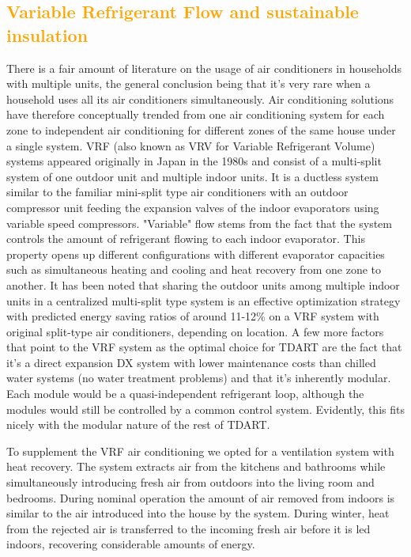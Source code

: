 \documentclass[justified]{tufte-book}
\begin{document}
	\textcolor{orange}{\chapter{Variable Refrigerant Flow and sustainable insulation}}
	There is a fair amount of literature\cite{jian2011study, ran2011wu, li2014testing}  on the usage of air conditioners in households  with multiple units, the general conclusion being that it's very rare when a household uses all its air conditioners simultaneously.
	Air conditioning solutions have therefore conceptually trended from one air conditioning system for each zone to independent air conditioning for different zones of the same house under a single system\cite{park2001performance}. VRF (also known as VRV for Variable Refrigerant Volume) systems appeared originally in Japan in the 1980s and consist of a multi-split system of one outdoor unit and multiple indoor units. It is a ductless system similar to the familiar mini-split type air conditioners with an outdoor compressor unit feeding the expansion valves of the indoor evaporators using variable speed compressors. "Variable" flow stems from the fact that the system controls the amount of refrigerant flowing to each indoor evaporator. This property opens up different configurations with different evaporator capacities such as simultaneous heating and cooling and heat recovery from one zone to another\cite{goetzler2007variable}.
	It has been noted that sharing the outdoor units among multiple indoor units in a centralized multi-split type system is an effective optimization strategy\cite{li2017simulation} with predicted energy saving ratios of around 11-12\% on a VRF system with original split-type air conditioners, depending on location. A few more factors that point to the VRF system as the optimal choice for TDART are the fact that it's a direct expansion DX system with lower maintenance costs than chilled water systems (no water treatment problems) and that it's inherently modular. Each module would be a quasi-independent refrigerant loop, although the modules would still be controlled by a common control system. Evidently, this fits nicely with the modular nature of the rest of TDART.
\par To supplement the VRF air conditioning we opted for a ventilation system with heat recovery. The system extracts air from the kitchens and bathrooms while simultaneously introducing fresh air from outdoors into the living room and bedrooms. During nominal operation the amount of air removed from indoors is similar to the air introduced into the house by the system. During winter, heat from the rejected air is transferred to the incoming fresh air before it is led indoors, recovering considerable amounts of energy.
\end{document}
